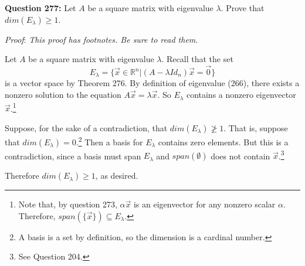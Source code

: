\documentclass{exam}
\begin{document}
\textbf{Question 277:} Let $A$ be a square matrix with eigenvalue $\lambda$. Prove that $dim(E_{\lambda})\geq 1$.\newline
\vspace{0.1in}
\newline

\textit{Proof}:  \textit{This proof has footnotes. Be sure to read them.}\newline
\vspace{0.1in}
\newline

Let $A$ be a square matrix with eigenvalue $\lambda$. Recall that the set $$E_{\lambda}=\{\Vec{x}\in\mathbb{R}^n | (A-\lambda Id_{n})\Vec{x}=\Vec{0}\}$$ is a vector space by Theorem 276. By definition of eigenvalue (266), there exists a nonzero solution to the equation $A\Vec{x}=\lambda\Vec{x}$. So $E_{\lambda}$ contains a nonzero eigenvector $\Vec{x}$.\footnote{Note that, by question 273, $\alpha\Vec{x}$ is an eigenvector for any nonzero scalar $\alpha$. Therefore, $span(\{\Vec{x}\})\subseteq E_{\lambda}$.} 

Suppose, for the sake of a contradiction, that $dim(E_{\lambda})\not\geq 1$. That is, suppose that $dim(E_{\lambda})=0$.\footnote{A basis is a set by definition, so the dimension is a cardinal number.} Then a basis for $E_{\lambda}$ contains zero elements. But this is a contradiction, since a basis must span $E_{\lambda}$ and $span(\emptyset)$ does not contain $\Vec{x}$.\footnote{See Question 204.}

Therefore $dim(E_{\lambda})\geq 1$, as desired.
\end{document}
